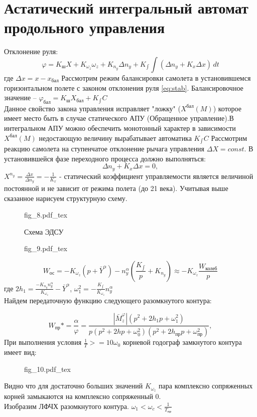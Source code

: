 \documentclass{article}
\begin{document}
\section{Астатический интегральный автомат продольного управления}
Отклонение руля:
\begin{equation}
	\varphi = K_\text{ш} X + K_{\omega_z} \omega_z + K_{n_y} \Delta n_y +
	K_{\int} \int (\Delta n_y + K_x \Delta x) \, dt
	\label{eq:stab}
\end{equation}
где $\Delta x = x - x_\text{бал}$
Рассмотрим режим балансировки самолета в установившемся горизонтальном полете с
законом отклонения руля \eqref{eq:stab}.
Балансировочное значение -- $\varphi_\text{бал} = K_\text{ш} X_\text{бал} +
	K_{\int} C$\\
Данное свойство закона управления исправляет "ложку" ($X^\text{бал}(M)$) которое
имеет место быть в случае статического АПУ (Обращенное управление).В
интегральном АПУ можно обеспечить монотонный характер в зависимости
$X^\text{бал} (M)$ недостающую величину вырабатывает автоматика $K_{\int}C$
Рассмотрим реакцию самолета на ступенчатое отклонение рычага управления $\Delta
	X = const$. В установившейся фазе переходного процесса должно выполняться:
\[
	\Delta n_y + K_x \Delta x = 0,
\]
$ X^{n_y} = \frac{\Delta x}{\Delta n_y} = -\frac{1}{K_x} $ - статический
коэффициент управляемости является величиной постоянной и не зависит от режима
полета (до 21 века).
Учитывая выше сказанное нарисуем структурную схему.
\begin{figure}[H]
	\begin{minipage}{\textwidth}
		\centering
		{fig_8.pdf_tex}
	\end{minipage}
	\caption{Схема ЭДСУ}
\end{figure}

\begin{figure}[H]
	\begin{minipage}{\textwidth}
		\centering
		{fig_9.pdf_tex}
	\end{minipage}
\end{figure}


\[
	W_\text{ос} = -K_{\omega_z} (p+\bar{Y}^\alpha) - n_y^\alpha
	(\frac{K_{\int}}{p} + K_{n_y})
	\approx -K_{\omega_z}\frac{W_\text{колеб}}{p}
\]
где $2h_1 = \frac{-K_{n_y} n_y^\alpha}{K_{\omega_z}} - \bar{Y}^\alpha$,
$\omega_1^2 = -\frac{K_{\int}} {K_{\omega_z}} n_y^\alpha $\\
Найдем передаточную функцию следующего разомкнутого контура:

\[
	W_\text{пр}* = {\frac{\alpha}{\varphi}} = \frac{|\bar{M}_z^\varphi| (p^2 +
		2h_1 p + \omega_1^2)} {p(p^2 + 2 hp + \omega_0^2) (p^2 + 2h_\text{пр}p +
		\omega_\text{пр}^2)},
\]
При выполнения условия $\frac{1}{T} >= 10 \omega_0$ корневой годограф
замкнутого контура имеет вид:
\begin{figure}[H]
	\centering
	{fig_10.pdf_tex}
\end{figure}
Видно что для достаточно больших значений $K_{\omega_z}$ пара комплексно
сопряженных корней замыкаются на комплексно сопряженный 0.\\
Изобразим ЛФЧХ разомкнутого контура.
$\omega_1 < \omega_c < \frac{1}{T_\text{пр}}$
\end{document}

